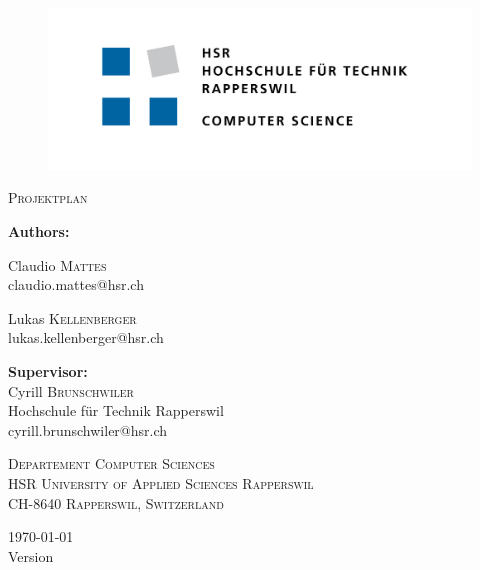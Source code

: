 \begin{titlepage}
	\centering
	\begin{figure}
		\centering
		\includegraphics[width=0.7\linewidth]{./assets/logo/hsr.png}  	
	\end{figure}

	{\scshape\Large Projektplan\par}
	\vspace{1.2cm}
	{\huge\bfseries \TITLE\par}
	\vspace{1.2cm}

	{\Large\textbf{Authors:} \\\vspace{0.2cm}}
	{\Large Claudio \textsc{Mattes} \\\small claudio.mattes@hsr.ch \par\vspace{0.2cm}
	\Large Lukas \textsc{Kellenberger} \\\small lukas.kellenberger@hsr.ch}

	\vspace{0.6cm}
	{\Large\textbf{Supervisor:} \\\vspace{0.2cm}}
	Cyrill \textsc{Brunschwiler}  \\ {\small Hochschule für Technik Rapperswil} \\\small cyrill.brunschwiler@hsr.ch \\

	\vspace{0.6cm}

	\vfill
	{\scshape\scriptsize Departement Computer Sciences \\ HSR University of Applied Sciences Rapperswil \\ CH-8640 Rapperswil, Switzerland \par}

	\vfill

    {\large \today \\ \small Version \VERSION}
\end{titlepage}